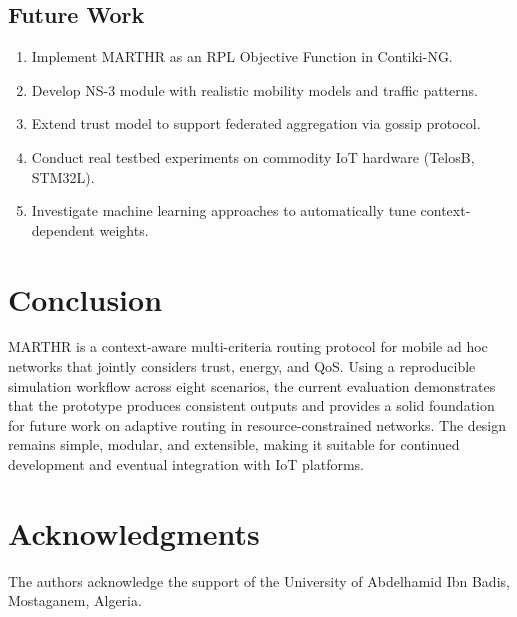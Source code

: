 \documentclass[conference]{IEEEtran}
\begin{document}
\subsection{Future Work}

\begin{enumerate}
\item Implement MARTHR as an RPL Objective Function in Contiki-NG.
\item Develop NS-3 module with realistic mobility models and traffic patterns.
\item Extend trust model to support federated aggregation via gossip protocol.
\item Conduct real testbed experiments on commodity IoT hardware (TelosB, STM32L).
\item Investigate machine learning approaches to automatically tune context-dependent weights.
\end{enumerate}

\section{Conclusion}

MARTHR is a context-aware multi-criteria routing protocol for mobile ad hoc networks that jointly considers trust, energy, and QoS. Using a reproducible simulation workflow across eight scenarios, the current evaluation demonstrates that the prototype produces consistent outputs and provides a solid foundation for future work on adaptive routing in resource-constrained networks. The design remains simple, modular, and extensible, making it suitable for continued development and eventual integration with IoT platforms.

\section*{Acknowledgments}

The authors acknowledge the support of the University of Abdelhamid Ibn Badis, Mostaganem, Algeria.

\clearpage


\end{document}

